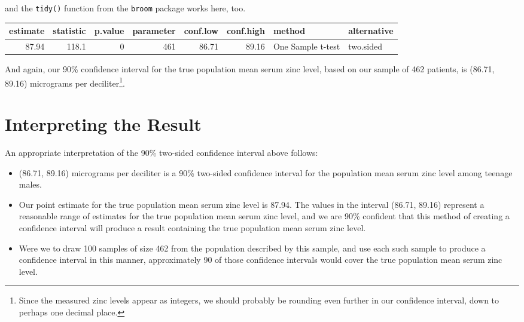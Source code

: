 \documentclass[
]{book}
\newenvironment{Shaded}{\begin{snugshade}}{\end{snugshade}}
\newcommand{\CommentTok}[1]{\textcolor[rgb]{0.56,0.35,0.01}{\textit{#1}}}
\newcommand{\DataTypeTok}[1]{\textcolor[rgb]{0.13,0.29,0.53}{#1}}
\newcommand{\DecValTok}[1]{\textcolor[rgb]{0.00,0.00,0.81}{#1}}
\newcommand{\FloatTok}[1]{\textcolor[rgb]{0.00,0.00,0.81}{#1}}
\newcommand{\KeywordTok}[1]{\textcolor[rgb]{0.13,0.29,0.53}{\textbf{#1}}}
\newcommand{\NormalTok}[1]{#1}
\newcommand{\OperatorTok}[1]{\textcolor[rgb]{0.81,0.36,0.00}{\textbf{#1}}}
\newcommand{\OtherTok}[1]{\textcolor[rgb]{0.56,0.35,0.01}{#1}}
\newcommand{\StringTok}[1]{\textcolor[rgb]{0.31,0.60,0.02}{#1}}
\providecommand{\tightlist}{%
  \setlength{\itemsep}{0pt}\setlength{\parskip}{0pt}}
\begin{document}
and the \texttt{tidy()} function from the \texttt{broom} package works here, too.

\begin{Shaded}
\end{Shaded}

\begin{tabular}{r|r|r|r|r|r|l|l}
\hline
estimate & statistic & p.value & parameter & conf.low & conf.high & method & alternative\\
\hline
87.94 & 118.1 & 0 & 461 & 86.71 & 89.16 & One Sample t-test & two.sided\\
\hline
\end{tabular}

And again, our 90\% confidence interval for the true population mean serum zinc level, based on our sample of 462 patients, is (86.71, 89.16) micrograms per deciliter\footnote{Since the measured zinc levels appear as integers, we should probably be rounding even further in our confidence interval, down to perhaps one decimal place.}.

\hypertarget{interpreting-the-result}{%
\section{Interpreting the Result}\label{interpreting-the-result}}

An appropriate interpretation of the 90\% two-sided confidence interval above follows:

\begin{itemize}
\tightlist
\item
  (86.71, 89.16) micrograms per deciliter is a 90\% two-sided confidence interval for the population mean serum zinc level among teenage males.
\item
  Our point estimate for the true population mean serum zinc level is 87.94. The values in the interval (86.71, 89.16) represent a reasonable range of estimates for the true population mean serum zinc level, and we are 90\% confident that this method of creating a confidence interval will produce a result containing the true population mean serum zinc level.
\item
  Were we to draw 100 samples of size 462 from the population described by this sample, and use each such sample to produce a confidence interval in this manner, approximately 90 of those confidence intervals would cover the true population mean serum zinc level.
\end{itemize}
\end{document}
